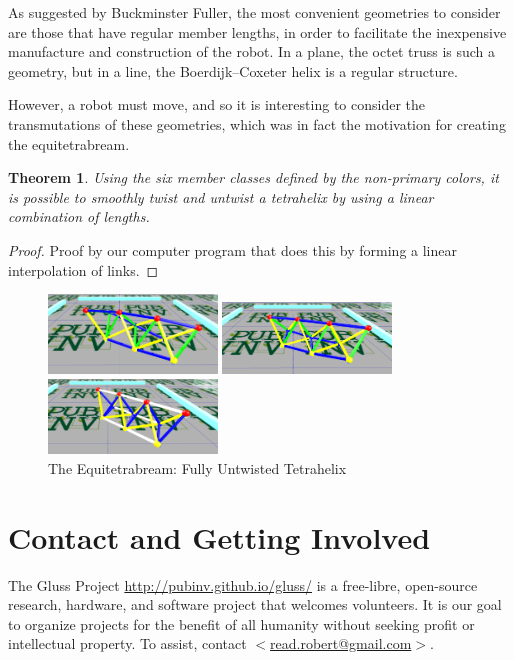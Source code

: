 \documentclass[11pt]{article}
\newtheorem{theorem}{Theorem}
\begin{document}
As suggested by Buckminster Fuller, the most convenient geometries to consider are those that have regular member
lengths, in order to facilitate the inexpensive manufacture and construction of the robot.  In a plane, the octet truss
is such a geometry, but in a line, the Boerdijk--Coxeter helix is a regular structure.

However, a robot must move, and so it is interesting to consider the transmutations of these geometries, which was in
fact the motivation for creating the equitetrabream.

\begin{theorem}

  Using the six member classes defined by the non-primary colors, it is possible to smoothly twist and untwist a tetrahelix by
  using a linear combination of lengths.
  
\end{theorem}

\begin{proof}
  Proof by our computer program that does this by forming a linear interpolation of links.
\end{proof}

\begin{figure}[H] %
  \centering
     \includegraphics[width=0.4\textwidth]{figures/Tetrahelix1.png}
     \caption{2/3rd Twisted Tetrahelix}
     \includegraphics[width=0.4\textwidth]{figures/Tetrahelix2.png}
     \caption{1/3rd Twisted, 2/3rd Untwisted Tetrahelix}
     \includegraphics[width=0.4\textwidth]{figures/Tetrahelix3.png}
     \caption{The Equitetrabream: Fully Untwisted Tetrahelix}
\end{figure}

\section{Contact and Getting Involved}

The Gluss Project \url{http://pubinv.github.io/gluss/}
is a free-libre, open-source research, hardware, and software project that welcomes volunteers.
It is our goal to organize projects for the benefit of all humanity without seeking profit or intellectual property.
To assist, contact \href{mailto:read.robert@gmail.com}{$<$read.robert@gmail.com$>$}.



\end{document}
